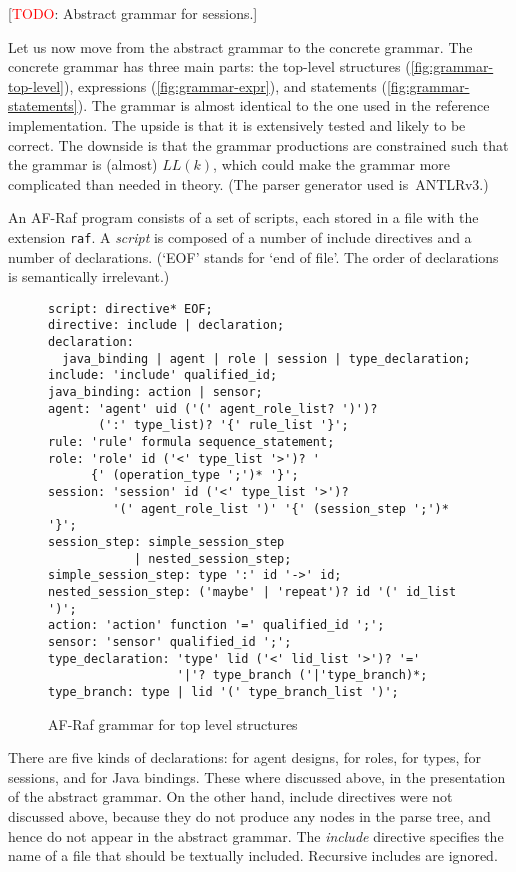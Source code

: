 \documentclass[a4paper,12pt,oneside,fleqn]{book} %
\newcommand{\todo}[1]{[\textcolor{red}{TODO}: #1]}
\begin{document}
\todo{Abstract grammar for sessions.}

Let us now move from the abstract grammar to the concrete grammar.  The
concrete grammar has three main parts: the top-level structures
(\autoref{fig:grammar-top-level}), expressions
(\autoref{fig:grammar-expr}), and statements
(\autoref{fig:grammar-statements}). The grammar is almost identical to the
one used in the reference implementation. The upside is that it is
extensively tested and likely to be correct. The downside is that the
grammar productions are constrained such that the grammar is (almost)
$LL(k)$, which could make the grammar more complicated than needed in
theory. (The parser generator used is~ANTLRv3.)

An AF-Raf program consists of a set of scripts, each stored in a file with
the extension {\tt raf}.  A {\it script\/} is composed of a number of
include directives and a number of declarations. (`EOF' stands for `end of
file'. The order of declarations is semantically irrelevant.)

\begin{figure}[h]\footnotesize %
\begin{verbatim}
script: directive* EOF;
directive: include | declaration;
declaration:
  java_binding | agent | role | session | type_declaration;
include: 'include' qualified_id;
java_binding: action | sensor;
agent: 'agent' uid ('(' agent_role_list? ')')?
       (':' type_list)? '{' rule_list '}';
rule: 'rule' formula sequence_statement;
role: 'role' id ('<' type_list '>')? '
      {' (operation_type ';')* '}';
session: 'session' id ('<' type_list '>')?
         '(' agent_role_list ')' '{' (session_step ';')* '}';
session_step: simple_session_step
            | nested_session_step;
simple_session_step: type ':' id '->' id;
nested_session_step: ('maybe' | 'repeat')? id '(' id_list ')';
action: 'action' function '=' qualified_id ';';
sensor: 'sensor' qualified_id ';';
type_declaration: 'type' lid ('<' lid_list '>')? '='
                  '|'? type_branch ('|'type_branch)*;
type_branch: type | lid '(' type_branch_list ')';
\end{verbatim}
\caption{AF-Raf grammar for top level structures}
\label{fig:grammar-top-level}
\end{figure} %

There are five kinds of declarations: for agent designs, for roles, for
types, for sessions, and for Java bindings. These where discussed above, in
the presentation of the abstract grammar. On the other hand, include
directives were not discussed above, because they do not produce any nodes
in the parse tree, and hence do not appear in the abstract grammar.  The
{\it include} directive specifies the name of a file that should be
textually included. Recursive includes are ignored.
\end{document}
